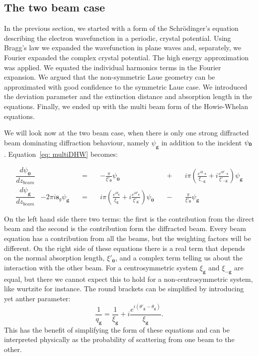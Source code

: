\subsection{The two beam case}

In the previous section, we started with a form of the Schr{\"o}dinger's equation describing the electron wavefunction in a periodic, crystal potential. Using Bragg's law we expanded the wavefunction in plane waves and, separately, we Fourier expanded the complex crystal potential. The high energy approximation was applied. We equated the individual harmonics terms in the Fourier expansion. We argued that the non-symmetric Laue geometry can be approximated with good confidence to the symmetric Laue case. We introduced the deviation parameter and the extinction distance and absorption length in the equations. Finally, we ended up with the multi beam form of the Howie-Whelan equations. 

We will look now at the two beam case, when there is only one strong diffracted beam dominating diffraction behaviour,  namely $\psi_{\mathbf{g}}$ in addition to the incident $\psi_{\vb{0}}$. Equation~\ref{eq: multiDHW} becomes:

\begin{equation}\label{eq:twobeam1}
\begin{alignedat}{6}
\dfrac{d\psi_{\mathbf{0}}}{dz_{beam}} &  & \quad = \quad
& -\frac{\pi}{\xi'_\mathbf{0}}\psi_\mathbf{0} & 
\quad + \quad & i \pi \left( \frac{e^{i \theta_{-\mathbf{g}}}}{\xi_{-\mathbf{g}}} + i \frac{ e^{i \theta'_{-\mathbf{g}}}}{\xi'_{-\mathbf{g}}} \right) \psi_{\mathbf{g}} \\
\dfrac{d{\psi_\mathbf{g}}}{dz_{beam}} &- 2 \pi i \mathbf{s}_g \psi_{\mathbf{g}} & \quad  = \quad
&i \pi\left(\frac{e^{i \theta_{\mathbf{g}}}}{\xi_{\mathbf{g}}} + i \frac{ e^{i \theta'_{\mathbf{g}}}}{\xi'_{\mathbf{g}}} \right) \psi_{\mathbf{0}} &
\quad - \quad & \frac{\pi}{\xi'_\mathbf{0}}\psi_{\mathbf{g}} 
\end{alignedat}
\end{equation}

On the left hand side there two terms: the first is the contribution from the direct beam and the second is the contribution form the diffracted beam. Every beam equation has a contribution from all the beams, but the weighting factors will be different. On the right side of these equations there is a real term that depends on the normal absorption length, $\xi'_{\mathbf{0}}$, and a complex term telling us about the interaction with the other beam. For a centrosymmetric system $\xi_{\mathbf{g}}$ and $\xi_{\mathbf{-g}}$ are equal, but there we cannot expect this to hold for a non-centrosymmetric system, like wurtzite for instance. 
The round brackets can be simplified by introducing yet anther parameter: 
\begin{equation*}
    \frac{1}{q_{\mathbf{g}}} = \frac{1}{\xi_{\mathbf{g}}} + i \frac{e^{i (\theta'_{\mathbf{g}} -  \theta_{\mathbf{g}} )}}{\xi_{\mathbf{g}}}. 
\end{equation*}
This has the benefit of simplifying the form of these equations and can be interpreted physically as the probability of scattering from one beam to the other. 

